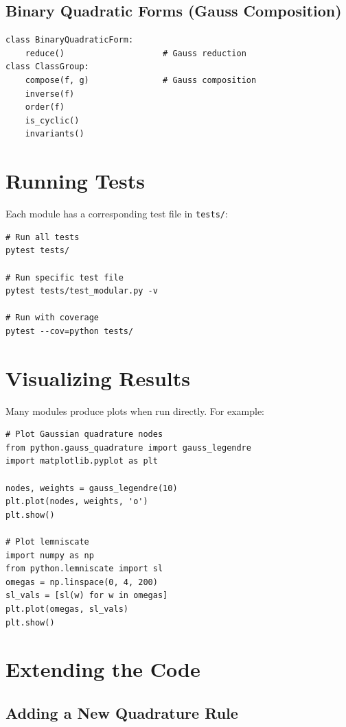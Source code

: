 \documentclass[11pt,a4paper]{article}
\begin{document}
\subsection{Binary Quadratic Forms (Gauss Composition)}
\begin{lstlisting}[style=python]
class BinaryQuadraticForm:
    reduce()                    # Gauss reduction
class ClassGroup:
    compose(f, g)               # Gauss composition
    inverse(f)
    order(f)
    is_cyclic()
    invariants()
\end{lstlisting}

\section{Running Tests}

Each module has a corresponding test file in \texttt{tests/}:

\begin{lstlisting}[style=bash]
# Run all tests
pytest tests/

# Run specific test file
pytest tests/test_modular.py -v

# Run with coverage
pytest --cov=python tests/
\end{lstlisting}

\section{Visualizing Results}

Many modules produce plots when run directly. For example:

\begin{lstlisting}[style=python]
# Plot Gaussian quadrature nodes
from python.gauss_quadrature import gauss_legendre
import matplotlib.pyplot as plt

nodes, weights = gauss_legendre(10)
plt.plot(nodes, weights, 'o')
plt.show()

# Plot lemniscate
import numpy as np
from python.lemniscate import sl
omegas = np.linspace(0, 4, 200)
sl_vals = [sl(w) for w in omegas]
plt.plot(omegas, sl_vals)
plt.show()
\end{lstlisting}

\section{Extending the Code}

\subsection{Adding a New Quadrature Rule}
\end{document}

